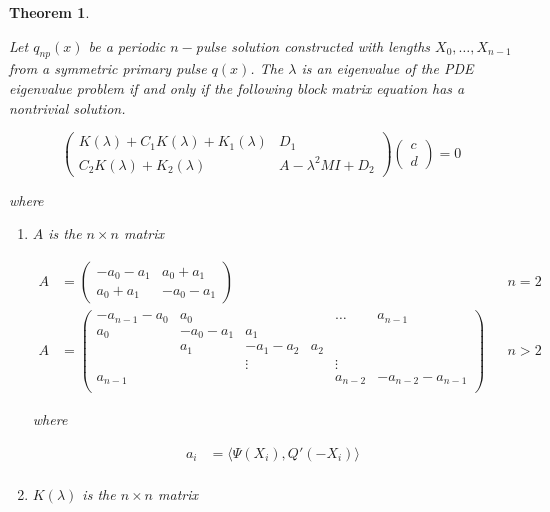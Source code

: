 \documentclass[12pt]{article}
\newtheorem{theorem}{Theorem}
\begin{document}
\begin{theorem}\label{blockmatrixform}

Let $q_{np}(x)$ be a periodic $n-$pulse solution constructed with lengths $X_0, \dots, X_{n-1}$from a symmetric primary pulse $q(x)$. The $\lambda$ is an eigenvalue of the PDE eigenvalue problem if and only if the following block matrix equation has a nontrivial solution.

\begin{equation}\label{blockeq}
\begin{pmatrix}
K(\lambda) + C_1 K(\lambda) + K_1(\lambda) & D_1 \\
C_2 K(\lambda) + K_2(\lambda) & A - \lambda^2 MI + D_2
\end{pmatrix}
\begin{pmatrix}c \\ d \end{pmatrix} 
= 0
\end{equation}

where 

\begin{enumerate}

\item $A$ is the $n \times n$ matrix

\begin{align}\label{defA}
A &= \begin{pmatrix}
-a_0 -a_1 & a_0 + a_1 \\
a_0 + a_1 & -a_0 - a_1
\end{pmatrix} && n = 2 \\
A &= \begin{pmatrix}
-a_{n-1} - a_0 & a_0 & & & \dots & a_{n-1}\\
a_0 & -a_0 - a_1 &  a_1 \\
& a_1 & -a_1 - a_2 &  a_2 \\
& & \vdots & & \vdots \\
a_{n-1} & & & & a_{n-2} & -a_{n-2} - a_{n-1} \\
\end{pmatrix} && n > 2 \nonumber
\end{align}

where

\begin{align*}
a_i &= \langle \Psi(X_i), Q'(-X_i) \rangle \\
\end{align*}

\item $K(\lambda)$ is the $n \times n$ matrix


\end{enumerate}
\end{theorem}
\end{document}
